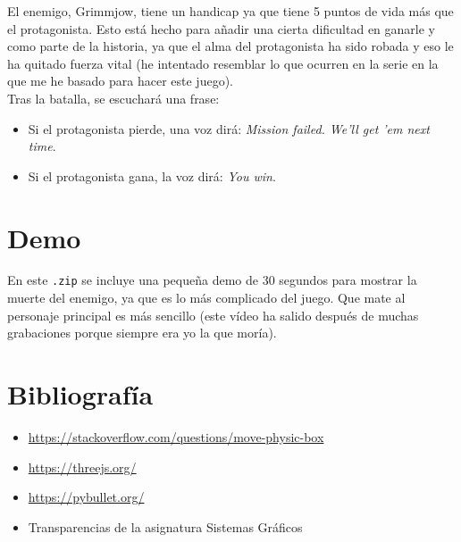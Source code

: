 \documentclass[11pt,a4paper]{article}
\begin{document}
El enemigo, Grimmjow, tiene un handicap ya que tiene 5 puntos de vida más que el protagonista. Esto está hecho para añadir una cierta dificultad en ganarle y como parte de la historia, ya que el alma del protagonista ha sido robada y eso le ha quitado fuerza vital (he intentado resemblar lo que ocurren en la serie en la que me he basado para hacer este juego).\\

Tras la batalla, se escuchará una frase:

\begin{itemize}
	\item Si el protagonista pierde, una voz dirá: \textit{Mission failed. We'll get 'em next time}.
	\item Si el protagonista gana, la voz dirá: \textit{You win}.
\end{itemize}

\section{Demo}

En este \texttt{.zip} se incluye una pequeña demo de 30 segundos para mostrar la muerte del enemigo, ya que es lo más complicado del juego. Que mate al personaje principal es más sencillo (este vídeo ha salido después de muchas grabaciones porque siempre era yo la que moría).

\section{Bibliografía}

\begin{itemize}
	\item \color{blue}\href{https://stackoverflow.com/questions/34569703/raycaster-does-not-move-boxmesh-objects}{https://stackoverflow.com/questions/move-physic-box}\color{black}
	\item \color{blue}\href{https://threejs.org/}{https://threejs.org/}\color{black}
	\item \color{blue}\href{https://pybullet.org/Bullet/phpBB3/index.php?sid=0e8c6e5111583be0d17f1731e4c1dc19}{https://pybullet.org/}\color{black}
	\item Transparencias de la asignatura Sistemas Gráficos
\end{itemize}
\end{document}
